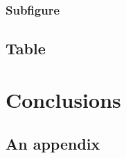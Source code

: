 \documentclass[12pt,a4paper,twoside]{report}
\begin{document}
      \FloatBarrier

      \subsection{Subfigure}
        \label{sec:subfig}
        

     \clearpage

    \section{Table}
      \label{sec:tbl}
      

  \cleardoublepage

  \chapter{Conclusions}
    \label{sec:outro}
    

  \nocite{*}  %
  
  

  \appendixpage
  \addappheadtotoc

  \renewcommand\thesection{\Alph{section}}

  \appendix
    \section{An appendix}
    \label{sec:app}
    
\end{document}
